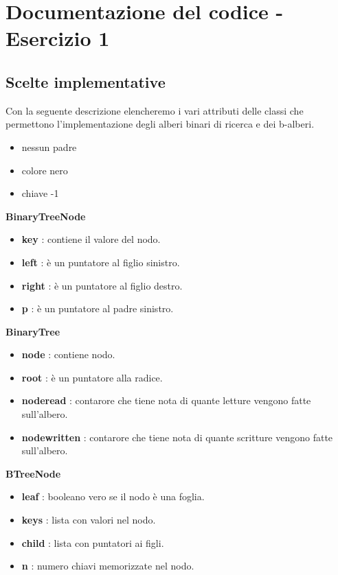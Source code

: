 \newpage
\section{Documentazione del codice - Esercizio 1}

\subsection{Scelte implementative}
\label{sec:ScelteImplementative_1}
Con la seguente descrizione elencheremo i vari attributi delle classi che permettono l'implementazione degli alberi binari di ricerca e dei b-alberi.

\begin{itemize}
    \item nessun padre
    \item colore nero
    \item chiave -1
\end{itemize}

\item \textbf{BinaryTreeNode}
    \begin{itemize}
        \item \textbf{key} : contiene il valore del nodo.
        \item \textbf{left} : è un puntatore al figlio sinistro.
        \item \textbf{right} : è un puntatore al figlio destro.
        \item \textbf{p} : è un puntatore al padre sinistro.
    \end{itemize}

\item \textbf{BinaryTree}
    \begin{itemize}
        \item \textbf{node} : contiene nodo.
        \item \textbf{root} : è un puntatore alla radice.
        \item \textbf{node\textunderscore read} : contarore che tiene nota di quante letture vengono fatte sull'albero.
        \item \textbf{node\textunderscore written} : contarore che tiene nota di quante scritture vengono fatte sull'albero.
    \end{itemize}

\item \textbf{BTreeNode}
    \begin{itemize}
        \item \textbf{leaf} : booleano vero se il nodo è una foglia.
        \item \textbf{keys} : lista con valori nel nodo.
        \item \textbf{child} : lista con puntatori ai figli.
        \item \textbf{n} : numero chiavi memorizzate nel nodo.
    \end{itemize}

